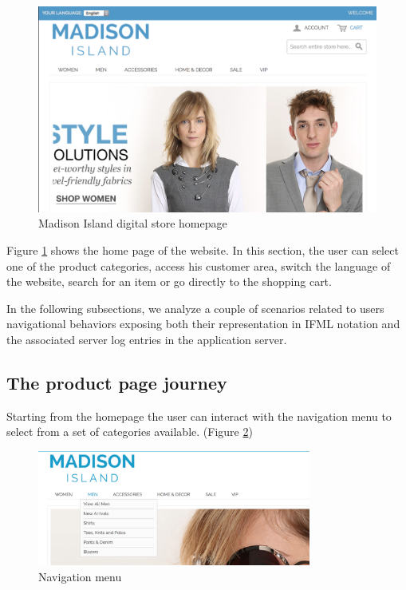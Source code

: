 \vspace{0.5cm}
\begin{figure}[htbp]
  \centering
    \includegraphics[width=12cm]{images/home.png}
  \caption{Madison Island digital store homepage}
  \label{fig:home}
\end{figure}
\vspace{0.5cm}


Figure \ref{fig:home} shows the home page of the website. In this section, the user can select one of the product categories, access his customer area, switch the language of the website, search for an item or go directly to the shopping cart. 

In the following subsections, we analyze a couple of scenarios related to users navigational behaviors exposing both their representation in IFML notation and the associated server log entries in the application server.

\newpage
\subsection{The product page journey}

Starting from the homepage the user can interact with the navigation menu to select from a set of categories available.  (Figure \ref{fig:navigation})

\vspace{0.5cm}
\begin{figure}[H]
  \centering
    \includegraphics[width=9cm]{images/madison/navigation.png}
  \caption{Navigation menu}
  \label{fig:navigation}
\end{figure}
\vspace{0.5cm}

